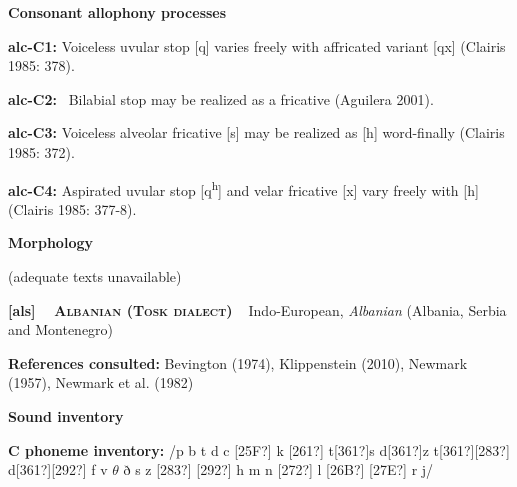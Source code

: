 \begin{styleBody}
\textbf{Consonant allophony processes}
\end{styleBody}

\begin{styleBody}
\textbf{alc-C1:} Voiceless uvular stop [q] varies freely with affricated variant [qx] (Clairis 1985: 378).
\end{styleBody}

\begin{styleBody}
\textbf{alc-C2: }\ Bilabial stop may be realized as a fricative (Aguilera 2001).
\end{styleBody}

\begin{styleBody}
\textbf{alc-C3: }Voiceless alveolar fricative [s] may be realized as [h] word-finally (Clairis 1985: 372).
\end{styleBody}

\begin{styleBody}
\textbf{alc-C4: }Aspirated uvular stop [q\textsuperscript{h}] and velar fricative [x] vary freely with [h] (Clairis 1985: 377-8).
\end{styleBody}

\begin{styleBody}
\textbf{Morphology}
\end{styleBody}

\begin{styleBody}
(adequate texts unavailable)
\end{styleBody}

\clearpage\begin{styleBody}
\textbf{[als] }\ \ \textbf{\textsc{Albanian (Tosk dialect)}}\textbf{\ \ }Indo-European, \textit{Albanian} (Albania, Serbia and Montenegro)
\end{styleBody}

\begin{styleBody}
\textbf{References consulted:} Bevington (1974), Klippenstein (2010), Newmark (1957), Newmark et al. (1982)
\end{styleBody}

\begin{styleBody}
\textbf{Sound inventory}
\end{styleBody}

\begin{styleBody}
\textbf{C phoneme inventory:} /p b t d c [25F?] k [261?] t[361?]s d[361?]z t[361?][283?] d[361?][292?] f v $\theta $ ð s z [283?] [292?] h m n [272?] l [26B?] [27E?] r j/
\end{styleBody}

